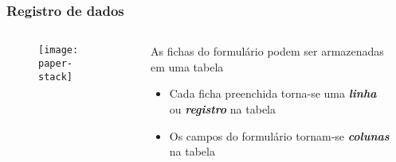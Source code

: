 \documentclass[t, 10pt, aspectratio=169, table, x11names]{beamer}
\begin{document}
	\begin{frame}
		\frametitle{Registro de dados}
		\begin{columns}[t]
			\begin{column}{0.40\textwidth}
				\begin{figure}[h]
					\texttt{[image: paper-stack]}
				\end{figure}
			\end{column}
			\begin{column}{0.55\textwidth}
				\vspace{2mm}
				
				As fichas do formulário podem ser armazenadas em uma tabela 
				\begin{itemize}
					\bigskip
					\item Cada ficha preenchida torna-se uma \textbf\textit{linha} ou \textbf{\textit{registro}} na tabela
					\item Os campos do formulário tornam-se \textbf{\textit{colunas}} na tabela
				\end{itemize}
			\end{column}
			\begin{column}{0.05\textwidth}
			\end{column}
		\end{columns}
	\end{frame}
\end{document}
